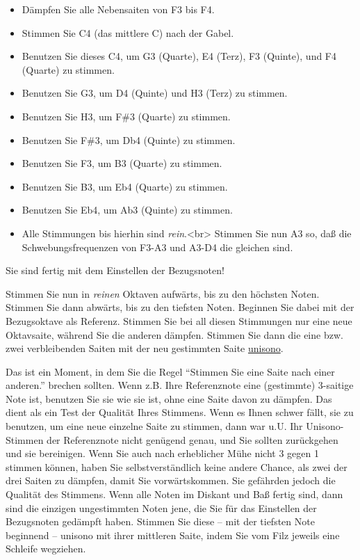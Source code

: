 \begin{itemize} 
 \item Dämpfen Sie alle Nebensaiten von F3 bis F4.
 \item Stimmen Sie C4 (das mittlere C) nach der Gabel.
 \item Benutzen Sie dieses C4, um G3 (Quarte), E4 (Terz), F3 (Quinte), und F4 (Quarte) zu stimmen.
 \item Benutzen Sie G3, um D4 (Quinte) und H3 (Terz) zu stimmen.
 \item Benutzen Sie H3, um F\#3 (Quarte) zu stimmen.
 \item Benutzen Sie F\#3, um Db4 (Quinte) zu stimmen.
 \item Benutzen Sie F3, um B3 (Quarte) zu stimmen.
 \item Benutzen Sie B3, um Eb4 (Quarte) zu stimmen.
 \item Benutzen Sie Eb4, um Ab3 (Quinte) zu stimmen.
 \item Alle Stimmungen bis hierhin sind \textit{rein}.<br>
Stimmen Sie nun A3 so, daß die Schwebungsfrequenzen von F3-A3 und A3-D4 die gleichen sind.
\end{itemize}

Sie sind fertig mit dem Einstellen der Bezugsnoten!


\label{c2_6_kirn2}

Stimmen Sie nun in \textit{reinen} Oktaven aufwärts, bis zu den höchsten Noten.
Stimmen Sie dann abwärts, bis zu den tiefsten Noten.
Beginnen Sie dabei mit der Bezugsoktave als Referenz.
Stimmen Sie bei all diesen Stimmungen nur eine neue Oktavsaite, während Sie die anderen dämpfen.
Stimmen Sie dann die eine bzw. zwei verbleibenden Saiten mit der neu gestimmten Saite \hyperref[c2_5_unis]{unisono}.

Das ist ein Moment, in dem Sie die Regel \enquote{Stimmen Sie eine Saite nach einer anderen.} brechen sollten.
Wenn z.B. Ihre Referenznote eine (gestimmte) 3-saitige Note ist, benutzen Sie sie wie sie ist, ohne eine Saite davon zu dämpfen.
Das dient als ein Test der Qualität Ihres Stimmens.
Wenn es Ihnen schwer fällt, sie zu benutzen, um eine neue einzelne Saite zu stimmen, dann war u.U. Ihr Unisono-Stimmen der Referenznote nicht genügend genau, und Sie sollten zurückgehen und sie bereinigen.
Wenn Sie auch nach erheblicher Mühe nicht 3 gegen 1 stimmen können, haben Sie selbstverständlich keine andere Chance, als zwei der drei Saiten zu dämpfen, damit Sie vorwärtskommen.
Sie gefährden jedoch die Qualität des Stimmens.
Wenn alle Noten im Diskant und Baß fertig sind, dann sind die einzigen ungestimmten Noten jene, die Sie für das Einstellen der Bezugsnoten gedämpft haben.
Stimmen Sie diese -- mit der tiefsten Note beginnend -- unisono mit ihrer mittleren Saite, indem Sie vom Filz jeweils eine Schleife wegziehen.
 

